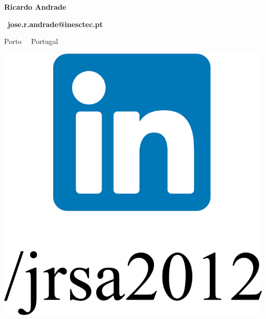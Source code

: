 \documentclass{mycv}
\begin{document}
\begin{center}
	{\LARGE\textbf{Ricardo Andrade}} \\
	\vspace{0.2cm}	
	
	\ \textbf{jose.r.andrade@inesctec.pt}
	
	
	\vspace{0.2cm}	
	
		Porto~\textbullet 
	\ Portugal

\end{center}

\begin{center}
	
	\href{https://www.linkedin.com/in/jrsa2012}{\includegraphics[scale=0.06]{figs/linkedin_logo_label.png}}
	\ \ \ \ \ \ \ \ \ \ \

\end{center}
\end{document}
